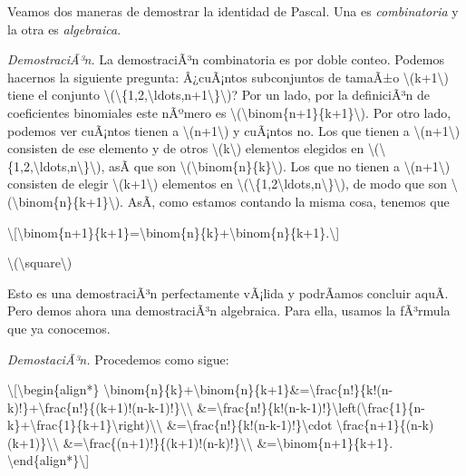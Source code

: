 \documentclass[
]{article}
\begin{document}
Veamos dos maneras de demostrar la identidad de Pascal. Una es
\emph{combinatoria} y la otra es \emph{algebraica}.

\emph{DemostraciÃ³n.} La demostraciÃ³n combinatoria es por doble conteo.
Podemos hacernos la siguiente pregunta: Â¿cuÃ¡ntos subconjuntos de
tamaÃ±o {\textbackslash(k+1\textbackslash)} tiene el conjunto
{\textbackslash(\textbackslash\{1,2,\textbackslash ldots,n+1\textbackslash\}\textbackslash)}?
Por un lado, por la definiciÃ³n de coeficientes binomiales este nÃºmero
es {\textbackslash(\textbackslash binom\{n+1\}\{k+1\}\textbackslash)}.
Por otro lado, podemos ver cuÃ¡ntos tienen a
{\textbackslash(n+1\textbackslash)} y cuÃ¡ntos no. Los que tienen a
{\textbackslash(n+1\textbackslash)} consisten de ese elemento y de otros
{\textbackslash(k\textbackslash)} elementos elegidos en
{\textbackslash(\textbackslash\{1,2,\textbackslash ldots,n\textbackslash\}\textbackslash)},
asÃ­ que son
{\textbackslash(\textbackslash binom\{n\}\{k\}\textbackslash)}. Los que
no tienen a {\textbackslash(n+1\textbackslash)} consisten de elegir
{\textbackslash(k+1\textbackslash)} elementos en
{\textbackslash(\textbackslash\{1,2\textbackslash ldots,n\textbackslash\}\textbackslash)},
de modo que son
{\textbackslash(\textbackslash binom\{n\}\{k+1\}\textbackslash)}. AsÃ­,
como estamos contando la misma cosa, tenemos que

\textbackslash{[}\textbackslash binom\{n+1\}\{k+1\}=\textbackslash binom\{n\}\{k\}+\textbackslash binom\{n\}\{k+1\}.\textbackslash{]}

{{\textbackslash(\textbackslash square\textbackslash)}}

Esto es una demostraciÃ³n perfectamente vÃ¡lida y podrÃ­amos concluir
aquÃ­. Pero demos ahora una demostraciÃ³n algebraica. Para ella, usamos
la fÃ³rmula que ya conocemos.

\emph{DemostaciÃ³n.} Procedemos como sigue:

\textbackslash{[}\textbackslash begin\{align*\}
\textbackslash binom\{n\}\{k\}+\textbackslash binom\{n\}\{k+1\}\&=\textbackslash frac\{n!\}\{k!(n-k)!\}+\textbackslash frac\{n!\}\{(k+1)!(n-k-1)!\}\textbackslash\textbackslash{}
\&=\textbackslash frac\{n!\}\{k!(n-k-1)!\}\textbackslash left(\textbackslash frac\{1\}\{n-k\}+\textbackslash frac\{1\}\{k+1\}\textbackslash right)\textbackslash\textbackslash{}
\&=\textbackslash frac\{n!\}\{k!(n-k-1)!\}\textbackslash cdot
\textbackslash frac\{n+1\}\{(n-k)(k+1)\}\textbackslash\textbackslash{}
\&=\textbackslash frac\{(n+1)!\}\{(k+1)!(n-k)!\}\textbackslash\textbackslash{}
\&=\textbackslash binom\{n+1\}\{k+1\}.
\textbackslash end\{align*\}\textbackslash{]}
\end{document}
